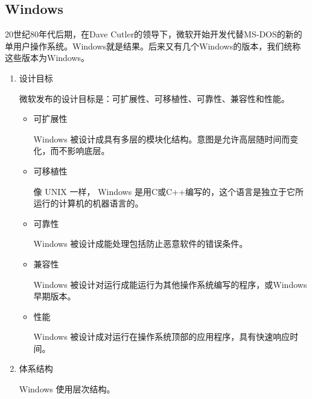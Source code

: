 \subsection{Windows}
20世纪80年代后期，在Dave Cutler的领导下，微软开始开发代替MS-DOS的新的单用户操作系统。Windows就是结果。后来又有几个Windows的版本，我们统称这些版本为Windows。
\begin{enumerate}
	\item 设计目标

	微软发布的设计目标是：可扩展性、可移植性、可靠性、兼容性和性能。
	\begin{itemize}
		\item 可扩展性

		Windows 被设计成具有多层的模块化结构。意图是允许高层随时间而变化，而不影响底层。
		\item 可移植性

		像 UNIX 一样， Windows 是用C或C++编写的，这个语言是独立于它所运行的计算机的机器语言的。
		\item 可靠性

		Windows 被设计成能处理包括防止恶意软件的错误条件。

		\item 兼容性

		Windows 被设计对运行成能运行为其他操作系统编写的程序，或Windows早期版本。

		\item 性能

		Windows 被设计成对运行在操作系统顶部的应用程序，具有快速响应时间。
	\end{itemize}
	\item 体系结构

	Windows 使用层次结构。
\end{enumerate}